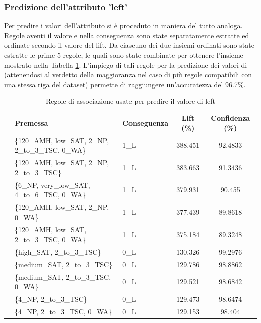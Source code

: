 \documentclass[a4paper]{article}
\newcounter{rowno}
\begin{document}
\subsubsection{Predizione dell'attributo 'left'}

Per predire i valori dell'attributo  si è proceduto in maniera del tutto analoga. Regole aventi il valore  e  nella conseguenza sono state separatamente estratte ed ordinate secondo il valore del lift. Da ciascuno dei due insiemi ordinati sono state estratte le prime 5 regole, le quali sono state combinate per ottenere l'insieme mostrato nella Tabella \ref{tab:rules_predict_left}. L'impiego di tali regole per la predizione dei valori di  (attenendosi al verdetto della maggioranza nel caso di più regole compatibili con una stessa riga del dataset) permette di raggiungere un'accuratezza del 96.7\%.

\begin{table}[h]
\centering
\begingroup
\setlength{\tabcolsep}{5pt} %
\renewcommand{\arraystretch}{1} %
\setcounter{rowno}{0}

\begin{tabularx}{\textwidth}{|>{\stepcounter{rowno}\therowno}c|X|l|c|c|}
\hline
\multicolumn{1}{r}{\#} & {\textbf{Premessa}} & {\textbf{Conseguenza}} & {\textbf{Lift (\%)}} & {\textbf{Confidenza (\%)}} \\

& \{120\_AMH, low\_SAT, 2\_NP, 2\_to\_3\_TSC, 0\_WA\} & 1\_L & 388.451 & 92.4833 \\ 
& \{120\_AMH, low\_SAT, 2\_NP, 2\_to\_3\_TSC\} & 1\_L & 383.663 & 91.3436 \\ 
& \{6\_NP, very\_low\_SAT, 4\_to\_6\_TSC, 0\_WA\} & 1\_L & 379.931 & 90.455 \\ 
& \{120\_AMH, low\_SAT, 2\_NP, 0\_WA\} & 1\_L & 377.439 & 89.8618 \\ 
& \{120\_AMH, low\_SAT, 2\_to\_3\_TSC, 0\_WA\} & 1\_L & 375.184 & 89.3248 \\ 
& \{high\_SAT, 2\_to\_3\_TSC\} & 0\_L & 130.326 & 99.2976 \\ 
& \{medium\_SAT, 2\_to\_3\_TSC\} & 0\_L & 129.786 & 98.8862 \\ 
& \{medium\_SAT, 2\_to\_3\_TSC, 0\_WA\} & 0\_L & 129.521 & 98.6842 \\ 
& \{4\_NP, 2\_to\_3\_TSC\} & 0\_L & 129.473 & 98.6474 \\ 
& \{4\_NP, 2\_to\_3\_TSC, 0\_WA\} & 0\_L & 129.153 & 98.404 \\ 

\hline
\end{tabularx}
\endgroup
\caption{Regole di associazione usate per predire il valore di left}
\label{tab:rules_predict_left}
\end{table}
\end{document}
